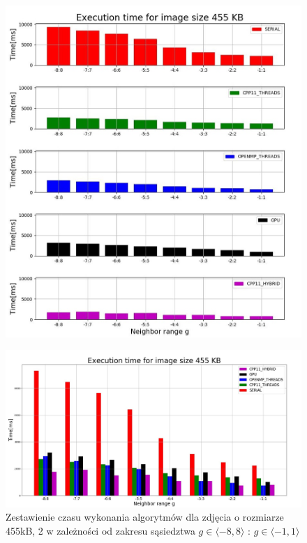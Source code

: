 \documentclass[document.tex]{subfiles}
\begin{document}
\clearpage
\begin{figure}[h]
\includegraphics[scale=0.6]{imgs/plot0_pc.jpg}
\caption*{}
\label{fig:results_pc_hybrid}
\end{figure}
\clearpage
\begin{figure}[h]
\includegraphics[scale=0.35]{imgs/plot4_pc.jpg}
\caption{Zestawienie czasu wykonania algorytmów dla zdjęcia o rozmiarze 455kB, 2
        w zależności od zakresu sąsiedztwa $g\in \langle -8, 8 \rangle$ : $g\in \langle -1, 1 \rangle$ }
\label{fig:results_pc_hybrid}
\end{figure}
\end{document}

